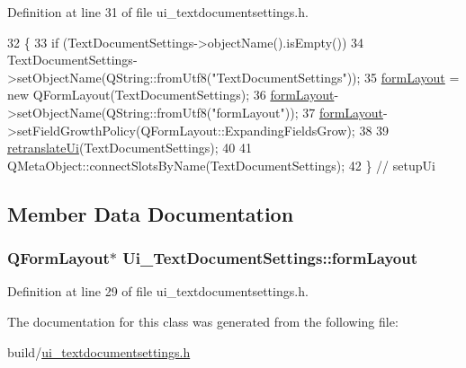 Definition at line 31 of file ui\+\_\+textdocumentsettings.\+h.


\begin{DoxyCode}
32     \{
33         \textcolor{keywordflow}{if} (TextDocumentSettings->objectName().isEmpty())
34             TextDocumentSettings->setObjectName(QString::fromUtf8(\textcolor{stringliteral}{"TextDocumentSettings"}));
35         \hyperlink{classUi__TextDocumentSettings_a1e46e2a4fcdca2d5ea087a09e12aea10}{formLayout} = \textcolor{keyword}{new} QFormLayout(TextDocumentSettings);
36         \hyperlink{classUi__TextDocumentSettings_a1e46e2a4fcdca2d5ea087a09e12aea10}{formLayout}->setObjectName(QString::fromUtf8(\textcolor{stringliteral}{"formLayout"}));
37         \hyperlink{classUi__TextDocumentSettings_a1e46e2a4fcdca2d5ea087a09e12aea10}{formLayout}->setFieldGrowthPolicy(QFormLayout::ExpandingFieldsGrow);
38 
39         \hyperlink{classUi__TextDocumentSettings_acf35bf0138554f6578f2a878077348e0}{retranslateUi}(TextDocumentSettings);
40 
41         QMetaObject::connectSlotsByName(TextDocumentSettings);
42     \} \textcolor{comment}{// setupUi}
\end{DoxyCode}


\subsection{Member Data Documentation}
\hypertarget{classUi__TextDocumentSettings_a1e46e2a4fcdca2d5ea087a09e12aea10}{
\subsubsection[{form\+Layout}]{\setlength{\rightskip}{0pt plus 5cm}Q\+Form\+Layout$\ast$ Ui\+\_\+\+Text\+Document\+Settings\+::form\+Layout}}\label{classUi__TextDocumentSettings_a1e46e2a4fcdca2d5ea087a09e12aea10}


Definition at line 29 of file ui\+\_\+textdocumentsettings.\+h.



The documentation for this class was generated from the following file\+:\begin{DoxyCompactItemize}
\item 
build/\hyperlink{ui__textdocumentsettings_8h}{ui\+\_\+textdocumentsettings.\+h}\end{DoxyCompactItemize}
